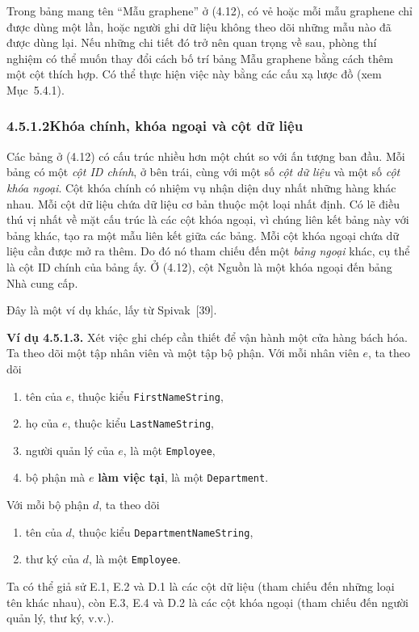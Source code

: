 Trong bảng mang tên ``Mẫu graphene'' ở (4.12), có vẻ hoặc mỗi mẫu graphene chỉ được dùng một lần, hoặc người ghi dữ liệu không theo dõi những mẫu nào đã được dùng lại. Nếu những chi tiết đó trở nên quan trọng về sau, phòng thí nghiệm có thể muốn thay đổi cách bố trí bảng Mẫu graphene bằng cách thêm một cột thích hợp. Có thể thực hiện việc này bằng các cấu xạ lược đồ (xem Mục~5.4.1).

\subsubsection*{4.5.1.2\quad Khóa chính, khóa ngoại và cột dữ liệu}

Các bảng ở (4.12) có cấu trúc nhiều hơn một chút so với ấn tượng ban đầu. Mỗi bảng có một \emph{cột ID chính}, ở bên trái, cùng với một số \emph{cột dữ liệu} và một số \emph{cột khóa ngoại}. Cột khóa chính có nhiệm vụ nhận diện duy nhất những hàng khác nhau. Mỗi cột dữ liệu chứa dữ liệu cơ bản thuộc một loại nhất định. Có lẽ điều thú vị nhất về mặt cấu trúc là các cột khóa ngoại, vì chúng liên kết bảng này với bảng khác, tạo ra một mẫu liên kết giữa các bảng. Mỗi cột khóa ngoại chứa dữ liệu cần được mở ra thêm. Do đó nó tham chiếu đến một \emph{bảng ngoại} khác, cụ thể là cột ID chính của bảng ấy. Ở (4.12), cột Nguồn là một khóa ngoại đến bảng Nhà cung cấp.

Đây là một ví dụ khác, lấy từ Spivak~[39].

\noindent\textbf{Ví dụ 4.5.1.3.}\keepwithnext
Xét việc ghi chép cần thiết để vận hành một cửa hàng bách hóa. Ta theo dõi một tập nhân viên và một tập bộ phận. Với mỗi nhân viên $e$, ta theo dõi
\begin{enumerate}[label=E.\arabic*]
\item tên của $e$, thuộc kiểu \texttt{FirstNameString},
\item họ của $e$, thuộc kiểu \texttt{LastNameString},
\item người quản lý của $e$, là một \texttt{Employee},
\item bộ phận mà $e$ \textbf{làm việc tại}, là một \texttt{Department}.
\end{enumerate}
Với mỗi bộ phận $d$, ta theo dõi
\begin{enumerate}[label=D.\arabic*]
\item tên của $d$, thuộc kiểu \texttt{DepartmentNameString},
\item thư ký của $d$, là một \texttt{Employee}.
\end{enumerate}
Ta có thể giả sử E.1, E.2 và D.1 là các cột dữ liệu (tham chiếu đến những loại tên khác nhau), còn E.3, E.4 và D.2 là các cột khóa ngoại (tham chiếu đến người quản lý, thư ký, v.v.).

